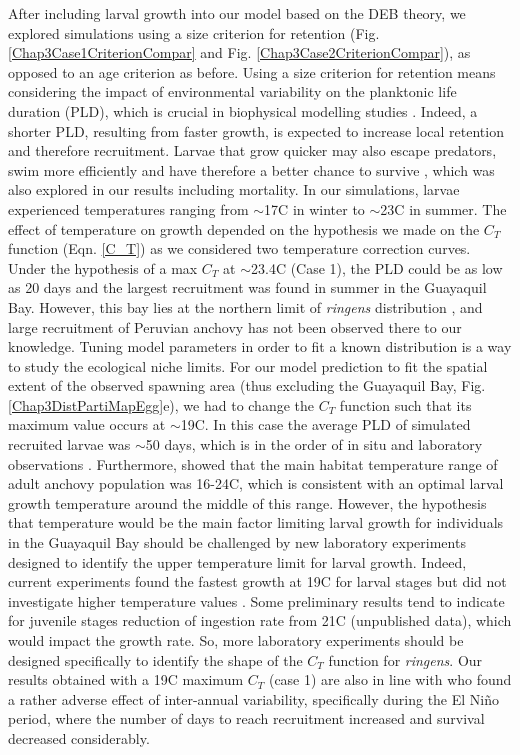 After including larval growth into our model based on the DEB theory, we explored simulations using a size criterion for retention (Fig. \ref{Chap3Case1CriterionCompar} and Fig. \ref{Chap3Case2CriterionCompar}), as opposed to an age criterion as before. Using a size criterion for retention means considering the impact of environmental variability on the planktonic life duration (PLD), which is crucial in biophysical modelling studies \citep{LettAyat2010}. Indeed, a shorter PLD, resulting from faster growth, is expected to increase local retention and therefore recruitment. Larvae that grow quicker may also escape predators, swim more efficiently and have therefore a better chance to survive \citep{Houd2008}, which was also explored in our results including mortality. In our simulations, larvae experienced temperatures ranging from $\sim$17\textdegree C in winter to $\sim$23\textdegree C in summer. The effect of temperature on growth depended on the hypothesis we made on the $C_T$ function (Eqn. \ref{C_T}) as we considered two temperature correction curves. Under the hypothesis of a max $C_T$ at $\sim$23.4\textdegree C (Case 1), the PLD could be as low as 20 days and the largest recruitment was found in summer in the Guayaquil Bay. However, this bay lies at the northern limit of \textit{\gls{ringens}} distribution \citep{CaldAyor2020}, and large recruitment of Peruvian anchovy has not been observed there to our knowledge. Tuning model parameters in order to fit a known distribution is a way to study the ecological niche limits. For our model prediction to fit the spatial extent of the observed spawning area (thus excluding the Guayaquil Bay, Fig. \ref{Chap3DistPartiMapEgg}e), we had to change the $C_T$ function such that its maximum value occurs at $\sim$19\textdegree C. In this case the average PLD of simulated recruited larvae was $\sim$50 days, which is in the order of in situ and laboratory observations \citep{PaloMuck1987}. Furthermore, \citep{CastPena2022} showed that the main habitat temperature range of adult anchovy population was 16-24\textdegree C, which is consistent with an optimal larval growth temperature around the middle of this range. However, the hypothesis that temperature would be the main factor limiting larval growth for individuals in the Guayaquil Bay should be challenged by new laboratory experiments designed to identify the upper temperature limit for larval growth. Indeed, current experiments found the fastest growth at 19\textdegree C for larval stages but did not investigate higher temperature values \citep{RiouOfel2021}. Some preliminary results tend to indicate for juvenile stages reduction of ingestion rate from 21\textdegree C (unpublished data), which would impact the growth rate. So, more laboratory experiments should be designed specifically to identify the shape of the $C_T$ function for \textit{\gls{ringens}}. Our results obtained with a 19\textdegree C maximum $C_T$ (case 1) are also in line with \cite{XuChai2013} who found a rather adverse effect of inter-annual variability, specifically during the El Niño period, where the number of days to reach recruitment increased and survival decreased considerably.\\

